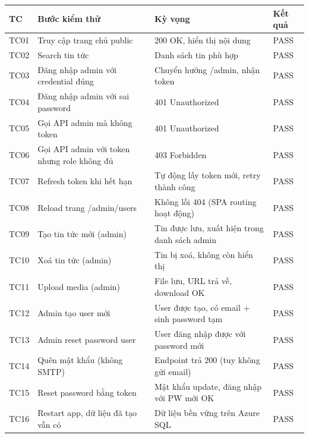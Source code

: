 \documentclass[12pt,a4paper,oneside]{report}
\begin{document}
\begin{longtable}{|p{}|p{}|p{}|p{}|}
\toprule
\textbf{TC} & \textbf{Bước kiểm thử} & \textbf{Kỳ vọng} & \textbf{Kết quả} \\
\midrule
\endhead

TC01 & Truy cập trang chủ public & 200 OK, hiển thị nội dung & PASS \\
\hline

TC02 & Search tin tức & Danh sách tin phù hợp & PASS \\
\hline

TC03 & Đăng nhập admin với credential đúng & Chuyển hướng /admin, nhận token & PASS \\
\hline

TC04 & Đăng nhập admin với sai password & 401 Unauthorized & PASS \\
\hline

TC05 & Gọi API admin mà không token & 401 Unauthorized & PASS \\
\hline

TC06 & Gọi API admin với token nhưng role không đủ & 403 Forbidden & PASS \\
\hline

TC07 & Refresh token khi hết hạn & Tự động lấy token mới, retry thành công & PASS \\
\hline

TC08 & Reload trang /admin/users & Không lỗi 404 (SPA routing hoạt động) & PASS \\
\hline

TC09 & Tạo tin tức mới (admin) & Tin được lưu, xuất hiện trong danh sách admin & PASS \\
\hline

TC10 & Xoá tin tức (admin) & Tin bị xoá, không còn hiển thị & PASS \\
\hline

TC11 & Upload media (admin) & File lưu, URL trả về, download OK & PASS \\
\hline

TC12 & Admin tạo user mới & User được tạo, có email + sinh password tạm & PASS \\
\hline

TC13 & Admin reset password user & User đăng nhập được với password mới & PASS \\
\hline

TC14 & Quên mật khẩu (không SMTP) & Endpoint trả 200 (tuy không gửi email) & PASS \\
\hline

TC15 & Reset password bằng token & Mật khẩu update, đăng nhập với PW mới OK & PASS \\
\hline

TC16 & Restart app, dữ liệu đã tạo vẫn có & Dữ liệu bền vững trên Azure SQL & PASS \\
\hline

\bottomrule
\end{longtable}
\end{document}
